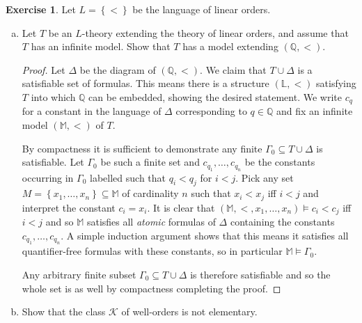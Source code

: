 \documentclass{article}
\newcommand{\Q}{\mathbb{Q}}
\newcommand{\set}[1]{\left\{#1\right\}}
\theoremstyle{definition}
\newtheorem{question}{Exercise}
\begin{document}
\begin{question}
    Let \(L=\set{<}\) be the language of linear orders.

    \begin{enumerate}[(a)]
        \item Let \(T\) be an \(L\)-theory extending the theory of linear
              orders, and assume that \(T\) has an infinite model. Show that
              \(T\) has a model extending \((\Q,<)\).

              \begin{proof}
                  Let \(\Delta\) be the diagram of \((\Q,<)\). We claim that
                  \(T\cup\Delta\) is a satisfiable set of formulas. This means
                  there is a structure \((\mathbb{L},<)\) satisfying \(T\) into
                  which \(\Q\) can be embedded, showing the desired statement.
                  We write \(c_{q}\) for a constant in the language of
                  \(\Delta\) corresponding to \(q\in\Q\) and fix an infinite
                  model \((\mathbb{M},<)\) of \(T\).

                  By compactness it is sufficient to demonstrate any finite
                  \(\Gamma_{0}\subseteq T\cup\Delta\) is satisfiable. Let
                  \(\Gamma_{0}\) be such a finite set and
                  \(c_{q_{1}},\ldots,c_{q_{n}}\) be the constants occurring in
                  \(\Gamma_{0}\) labelled such that \(q_{i}<q_{j}\) for \(i<j\).
                  Pick any set \(M=\set{x_{1},\ldots,x_{n}}\subseteq\mathbb{M}\)
                  of cardinality \(n\) such that \(x_{i}<x_{j}\) iff \(i<j\) and
                  interpret the constant \(c_{i}=x_{i}\). It is clear that
                  \((\mathbb{M},<,x_{1},\ldots,x_{n})\models c_{i}<c_{j}\) iff
                  \(i<j\) and so \(\mathbb{M}\) satisfies all \emph{atomic}
                  formulas of \(\Delta\) containing the constants
                  \(c_{q_{1}},\ldots,c_{q_{n}}\). A simple induction argument
                  shows that this means it satisfies all quantifier-free
                  formulas with these constants, so in particular
                  \(\mathbb{M}\models\Gamma_{0}\).

                  Any arbitrary finite subset \(\Gamma_{0}\subseteq
                  T\cup\Delta\) is therefore satisfiable and so the whole set is
                  as well by compactness completing the proof.
              \end{proof}

        \item Show that the class \(\mathcal{K}\) of well-orders is not
              elementary.


\end{enumerate}
\end{question}
\end{document}
